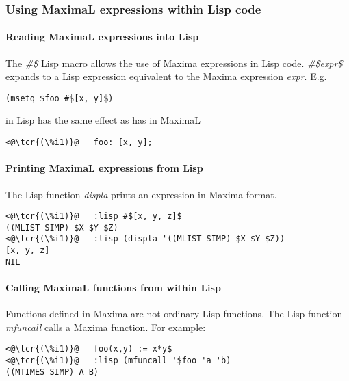 \documentclass[../Maxima_Workbook.tex]{subfiles}
\begin{document}
\subsubsection{Using MaximaL expressions within Lisp code}

\paragraph{Reading MaximaL expressions into Lisp} \mbox{}

\lz The \emph{\#\$} Lisp macro allows the use of Maxima expressions in Lisp code. \emph{\#\$expr\$} expands
to a Lisp expression equivalent to the Maxima expression \emph{expr}. E.g.

\begin{lstlisting}
(msetq $foo #$[x, y]$)
\end{lstlisting}

in Lisp has the same effect as has in MaximaL

\begin{lstlisting}
<@\tcr{(\%i1)}@   foo: [x, y];
\end{lstlisting}
\vspace{-2mm} 

\paragraph{Printing MaximaL expressions from Lisp} \mbox{}

\lz The Lisp function \emph{displa} prints an expression in Maxima format.

\lz \begin{small}
\color{blue}
\begin{lstlisting}
<@\tcr{(\%i1)}@   :lisp #$[x, y, z]$
((MLIST SIMP) $X $Y $Z)
<@\tcr{(\%i1)}@   :lisp (displa '((MLIST SIMP) $X $Y $Z))
[x, y, z]
NIL
\end{lstlisting}
\color{black}
\end{small}

\paragraph{Calling MaximaL functions from within Lisp} \mbox{}

\lz Functions defined in Maxima are not ordinary Lisp functions. The Lisp function
\emph{mfuncall} calls a Maxima function. For example:

\begin{lstlisting}
<@\tcr{(\%i1)}@   foo(x,y) := x*y$
<@\tcr{(\%i1)}@   :lisp (mfuncall '$foo 'a 'b)
((MTIMES SIMP) A B)
\end{lstlisting}
\vspace{-2mm} 
\end{document}
